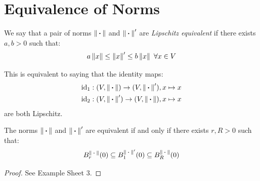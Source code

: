 \documentclass[../main.tex]{subfiles}
\begin{document}
\section{Equivalence of Norms}
\begin{definition}
  We say that a pair of norms $\norm{\argdot}$ and $\norm{\argdot}'$ are \textit{Lipschitz equivalent} if there exists $a, b > 0$ such that:
  \[
    a \norm{x} \leq \norm{x}' \leq b \norm{x}\ \forall x \in V
  \]
\end{definition}
\begin{remark}
  This is equivalent to saying that the identity maps:
  \begin{align*}
    \id_1: (V, \norm{\argdot}) \to (V, \norm{\argdot}'), x \mapsto x\\
    \id_2: (V, \norm{\argdot}') \to (V, \norm{\argdot}), x \mapsto x
  \end{align*}
  are both Lipschitz.
\end{remark}
\begin{proposition}
  The norms $\norm{\argdot}$ and $\norm{\argdot}'$ are equivalent if and only if there exists $r, R > 0$ such that:
  \[
    B^{\norm{\argdot}}_{r}(0) \subseteq B^{\norm{\argdot}'}_1(0) \subseteq B^{\norm{\argdot}}_R(0)
  \]
\end{proposition}
\begin{proof}
  See Example Sheet 3.
\end{proof}
\end{document}
